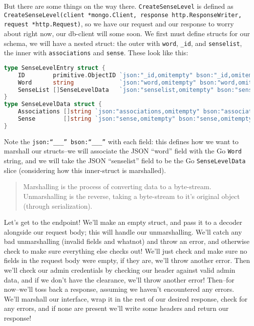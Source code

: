 \documentclass[11pt, twoside, reqno]{book}
\begin{document}
But there are some things on the way there. \texttt{CreateSenseLevel} is defined as \texttt{CreateSenseLevel(client *mongo.Client, response http.ResponseWriter, request *http.Request)}, so we have our request and our response to worry about right now, our db-client will some soon. We first must define structs for our schema, we will have a nested struct: the outer with \texttt{word}, \texttt{\_id}, and \texttt{senselist}, the inner with \texttt{associations} and \texttt{sense}. These look like this:
\begin{lstlisting}[language=Go]
type SenseLevelEntry struct {
	ID        primitive.ObjectID `json:"_id,omitempty" bson:"_id,omitempty"`
	Word      string             `json:"word,omitempty" bson:"word,omitempty"`
	SenseList []SenseLevelData   `json:"senselist,omitempty" bson:"senselist,omitempty"`
}
type SenseLevelData struct {
	Associations []string `json:"associations,omitempty" bson:"associations,omitempty"`
	Sense        []string `json:"sense,omitempty" bson:"sense,omitempty"`
}
\end{lstlisting}

Note the \texttt{json:``\_\_\_'' bson:``\_\_\_''} with each field: this defines how we want to marshall our structs--we will associate the JSON ``word'' field with the Go \texttt{Word} string, and we will take the JSON ``senselist'' field to be the Go \texttt{SenseLevelData} slice (considering how this inner-struct is marshalled).

\begin{quote}
Marshalling is the process of converting data to a byte-stream. Unmarshalling is the reverse, taking a byte-stream to it's original object (through serialization).
\end{quote}

Let's get to the endpoint! We'll make an empty struct, and pass it to a decoder alongside our request body; this will handle our unmarshalling. We'll catch any bad unmarshalling (invalid fields and whatnot) and throw an error, and otherwise check to make sure everything else checks out! We'll just check and make sure no fields in the request body were empty, if they are, we'll throw another error. Then we'll check our admin credentials by checking our header against valid admin data, and if we don't have the clearance, we'll throw another error! Then--for now--we'll toss back a response, assuming we haven't encountered any errors. We'll marshall our interface, wrap it in the rest of our desired response, check for any errors, and if none are present we'll write some headers and return our response!
\end{document}
